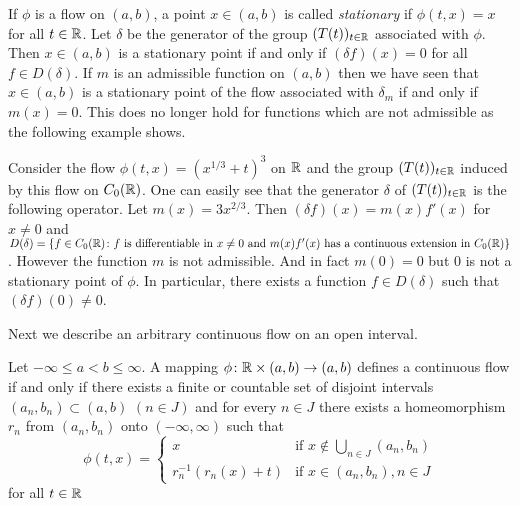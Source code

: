 \begin{remark}\label{rem:b2-3.19}
If $\phi$ is a flow on $(a,b)$, a point $x \in (a,b)$ is called \emph{stationary} if $\phi(t,x) = x$ for all $t \in \mathbb{R}$.
Let $\delta$ be the generator of the group $(T(t))_{t \in \mathbb{R}}$ associated with $\phi$.
Then $x \in (a,b)$ is a stationary point if and only if $(\delta f)(x) = 0$ for all $f \in D(\delta)$.
If $m$ is an admissible function on $(a,b)$ then we have seen that $x \in (a,b)$ is a stationary point of the flow associated with $\delta_{m}$ if and only if $m(x) = 0$.
This does no longer hold for functions which are not admissible as the following example shows.
\end{remark}
\begin{example}\label{ex:b2-3.20}
Consider the flow $\phi(t,x) = (x^{1/3} + t)^{3}$ on $\mathbb{R}$ and the group $(T(t))_{t \in \mathbb{R}}$ induced by this flow on $C_{0}(\mathbb{R})$.
One can easily see that the generator $\delta$ of $(T(t))_{t \in \mathbb{R}}$ is the following operator.
Let $m(x) = 3x^{2/3}$.
Then $(\delta f)(x) = m(x)f'(x)$ for $x \neq 0$ and $D(\delta) = \{ f \in C_{0}(\mathbb{R}) \colon f \text{ is differentiable in } x \neq 0 \text{ and } m(x)f'(x) \text{ has a continuous extension in } C_{0}(\mathbb{R}) \}$.
However the function $m$ is not admissible.
And in fact $m(0) = 0$ but $0$ is not a stationary point of $\phi$.
In particular, there exists a function $f \in D(\delta)$ such that $(\delta f)(0) \neq 0$.
\end{example}
Next we describe an arbitrary continuous flow on an open interval.
\begin{proposition}\label{prop:b2-3.21}
Let $-\infty \leq a < b \leq \infty$.
A mapping $\phi \colon \mathbb{R} \times (a,b) \to (a,b)$ defines a continuous flow if and only if there exists a finite or countable set of disjoint intervals $(a_{n},b_{n}) \subset (a,b)$ $(n \in J)$ and for every $n \in J$ there exists a homeomorphism $r_{n}$ from $(a_{n},b_{n})$ onto $(-\infty,\infty)$ such that
\begin{equation*}\label{eq:b2-flow}
\phi(t,x) = \begin{cases}
    x & \text{if } x \notin \bigcup_{n \in J} (a_{n},b_{n}) \\
    r_{n}^{-1}(r_{n}(x) + t) & \text{if } x \in (a_{n},b_{n}), n \in J
\end{cases}
\end{equation*}
for all $t \in \mathbb{R}$
\end{proposition}

